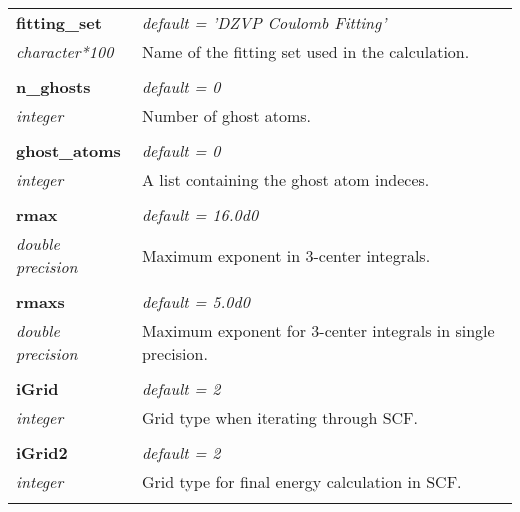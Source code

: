 \begin{Spacing}{1.0}
\begin{longtable}{ p{} p{} }
   \textbf{fitting\_set}
   &  \textit{default = 'DZVP Coulomb Fitting'}
   \\*\textit{character*100}
   & Name of the fitting set used in the calculation.\\* \\

   \textbf{n\_ghosts}
   &  \textit{default = 0}
   \\*\textit{integer}
   & Number of ghost atoms.\\* \\

   \textbf{ghost\_atoms}
   &  \textit{default = 0}
   \\*\textit{integer}
   & A list containing the ghost atom indeces. \\* \\

   \textbf{rmax}
   &  \textit{default = 16.0d0}
   \\*\textit{double precision}
   & Maximum exponent in 3-center integrals.
   \\* \\

   \textbf{rmaxs}
   &  \textit{default = 5.0d0}
   \\*\textit{double precision}
   & Maximum exponent for 3-center integrals in single
   precision.\\* \\

   \textbf{iGrid}
   &  \textit{default = 2}
   \\*\textit{integer}
   & Grid type when iterating through SCF.\\* \\

   \textbf{iGrid2}
   &  \textit{default = 2}
   \\*\textit{integer}
   & Grid type for final energy calculation in SCF.\\* \\


\end{longtable}
\end{Spacing}
